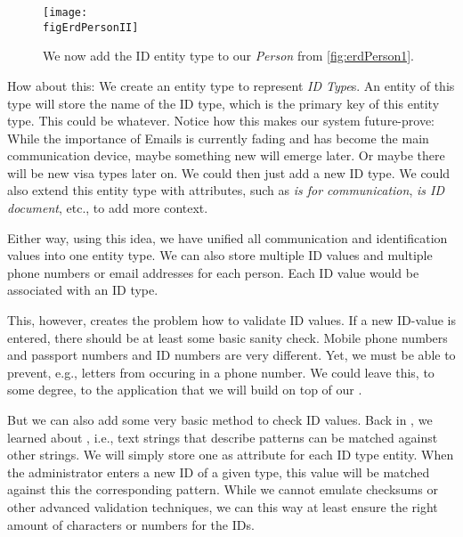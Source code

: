 \begin{figure}%
\centering%
\xdef\figErdPersonII{\currentDir/erdPerson2}%
\texttt{[image: \\figErdPersonII]}%
\caption{We now add the ID entity type to our \emph{Person}  from \cref{fig:erdPerson1}.}%
\label{fig:erdPerson2}%
\end{figure}%

How about this:
We create an entity type to represent \emph{ID Type}s.
An entity of this type will store the name of the ID type, which is the primary key of this entity type.
This could be           whatever.
Notice how this makes our system future-prove:
While the importance of Emails is currently fading and  has become the main communication device, maybe something new will emerge later.
Or maybe there will be new visa types later on.
We could then just add a new ID type.
We could also extend this entity type with attributes, such as \emph{is for communication}, \emph{is ID document}, etc., to add more context.

Either way, using this idea, we have unified all communication and identification values into one entity type.
We can also store multiple ID values and multiple phone numbers or email addresses for each person.
Each ID value would be associated with an ID type.

This, however, creates the problem how to validate ID values.
If a new ID-value is entered, there should be at least some basic sanity check.
Mobile phone numbers and passport numbers and ID numbers are very different.
Yet, we must be able to prevent, e.g., letters from occuring in a phone number.
We could leave this, to some degree, to the application that we will build on top of our \db.

But we can also add some very basic method to check ID values.
Back in , we learned about , i.e., text strings that describe patterns can be matched against other strings.
We will simply store one  as  attribute for each ID type entity.
When the administrator enters a new ID of a given type, this value will be matched against this the corresponding pattern.
While we cannot emulate checksums or other advanced validation techniques, we can this way at least ensure the right amount of characters or numbers for the IDs.

